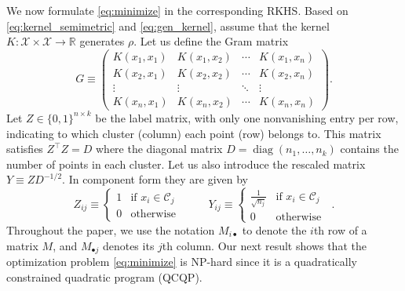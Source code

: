 \documentclass[aps,preprint,nofootinbib,floatfix]{revtex4-1}
\DeclareMathOperator{\diag}{diag}
\newcommand\kk{K}
\newcommand\C{{\mathcal{C}}}
\newcommand\Zt{Y}
\begin{document}
We now formulate \eqref{eq:minimize} in the corresponding
RKHS. Based on \eqref{eq:kernel_semimetric} and \eqref{eq:gen_kernel}, 
assume that the kernel $\kk: \mathcal{X} \times \mathcal{X} \to \mathbb{R}$ 
generates $\rho$.  Let us define  the Gram matrix
\begin{equation}
\label{eq:kernel_matrix}
G \equiv \begin{pmatrix}
\kk(x_1,x_1) & \kk(x_1,x_2) & \dotsm & \kk(x_1,x_n) \\
\kk(x_2,x_1) & \kk(x_2,x_2) & \dotsm & \kk(x_2,x_n) \\
\vdots & \vdots & \ddots  & \vdots \\
\kk(x_n,x_1) & \kk(x_n,x_2) & \dotsm & \kk(x_n,x_n) 
\end{pmatrix} .
\end{equation}
Let $Z \in \{ 0,1 \}^{n\times k}$ be the label matrix, 
with only one nonvanishing entry per row, 
indicating to which cluster (column)
each point (row) belongs to. This matrix satisfies
$Z^\top Z = D$ where the diagonal matrix 
$D = \diag( n_1,\dotsc, n_k )$  contains
the number of points in each cluster. Let us also introduce the rescaled
matrix  $Y \equiv Z D^{-1/2}$. In component form they are given by
\begin{equation}
\label{eq:label_matrix}
Z_{ij} \equiv \begin{cases}
1 & \mbox{if $x_i \in \C_j$ } \\
0 & \mbox{otherwise}
\end{cases} \qquad
\Zt_{ij} \equiv \begin{cases}
\tfrac{1}{\sqrt{n_j}} & \mbox{if $x_i \in \C_j$ } \\
0 & \mbox{otherwise}
\end{cases} .
\end{equation}
Throughout the paper, we use the notation $M_{i\bullet}$ to denote
the $i$th row of a matrix $M$, and $M_{\bullet j}$ denotes its $j$th column.
Our next result shows that the optimization problem \eqref{eq:minimize}
is NP-hard since
it is a quadratically constrained quadratic program (QCQP).
\end{document}
